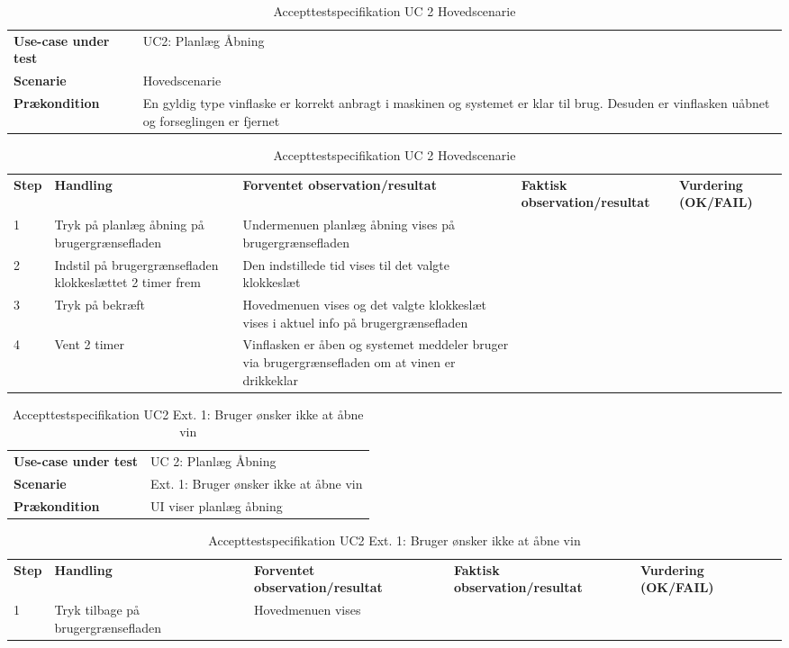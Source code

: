 \begin{table}[H]
	\centering
	\caption{Accepttestspecifikation UC 2 Hovedscenarie}
	\label{ATUC2:Hovedscenarie}
	\begin{tabular}{ p{80pt}  p{320pt} }\hline
		\rowcolor{lightgray}	
		\textbf{Use-case under test} & UC2: Planlæg Åbning \\
		\rowcolor{white}
		\textbf{Scenarie} & Hovedscenarie \\\rowcolor{lightgray}	
		\textbf{Prækondition} &
		En gyldig type vinflaske er korrekt anbragt i maskinen og systemet er klar til brug. Desuden er vinflasken uåbnet og forseglingen er fjernet \\
		\hline
	\end{tabular}
	\begin{tabular}{  p{26pt} p{100pt}  p{101pt} | p{67pt} | p{68pt}}
		\textbf{Step} & \textbf{Handling} & \textbf{Forventet observation/resultat} & \textbf{Faktisk observation/resultat} & \textbf{Vurdering (OK/FAIL)}\\
		1 & Tryk på planlæg åbning på brugergrænsefladen & Undermenuen planlæg åbning vises på brugergrænsefladen &  &  \\
		2 & Indstil på brugergrænsefladen klokkeslættet 2 timer frem & Den indstillede tid vises til det valgte klokkeslæt &  &  \\
		3 & Tryk på bekræft & Hovedmenuen vises og det valgte klokkeslæt vises i aktuel info på brugergrænsefladen &  &  \\
		4 & Vent 2 timer & Vinflasken er åben og systemet meddeler bruger via brugergrænsefladen om at vinen er drikkeklar &  &  \\
		\hline
	\end{tabular}
\end{table}

\begin{table}[H]
	\centering
	\caption{Accepttestspecifikation UC2 Ext. 1: Bruger ønsker ikke at åbne vin}
	\label{ATUC2:Ext1}
	\begin{tabular}{ p{80pt}  p{320pt} }\hline
		\rowcolor{lightgray}	
		\textbf{Use-case under test} & UC 2: Planlæg Åbning \\
		\rowcolor{white}
		\textbf{Scenarie} & Ext. 1: Bruger ønsker ikke at åbne vin \\\rowcolor{lightgray}	
		\textbf{Prækondition} &
		UI viser planlæg åbning \\
		\hline
	\end{tabular}
	\begin{tabular}{  p{26pt} p{100pt}  p{101pt} | p{67pt} | p{68pt}}
		\textbf{Step} & \textbf{Handling} & \textbf{Forventet observation/resultat} & \textbf{Faktisk observation/resultat} & \textbf{Vurdering (OK/FAIL)}\\
		1 & Tryk tilbage på brugergrænsefladen & Hovedmenuen vises
 &  &  \\
		\hline
	\end{tabular}
\end{table}

